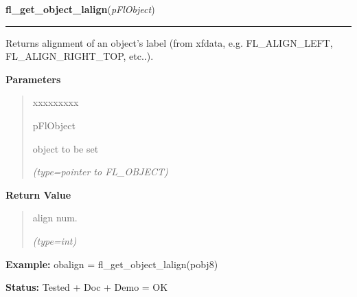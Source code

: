 \hspace{.8\funcindent}\begin{boxedminipage}{\funcwidth}

    \raggedright \textbf{fl\_get\_object\_lalign}(\textit{pFlObject})

    \vspace{-1.5ex}

    \rule{\textwidth}{0.5\fboxrule}
\setlength{\parskip}{2ex}
    Returns alignment of an object's label (from xfdata, e.g. 
    FL\_ALIGN\_LEFT, FL\_ALIGN\_RIGHT\_TOP, etc..).

\setlength{\parskip}{1ex}
      \textbf{Parameters}
      \vspace{-1ex}

      \begin{quote}
        \begin{Ventry}{xxxxxxxxx}

          \item[pFlObject]

          object to be set

            {\it (type=pointer to FL\_OBJECT)}

        \end{Ventry}

      \end{quote}

      \textbf{Return Value}
    \vspace{-1ex}

      \begin{quote}
      align num.

      {\it (type=int)}

      \end{quote}

\textbf{Example:} obalign = fl\_get\_object\_lalign(pobj8)



\textbf{Status:} Tested + Doc + Demo = OK



    \end{boxedminipage}

    \label{xformslib:flbasic:fl_set_object_lalign}

    \vspace{0.5ex}

